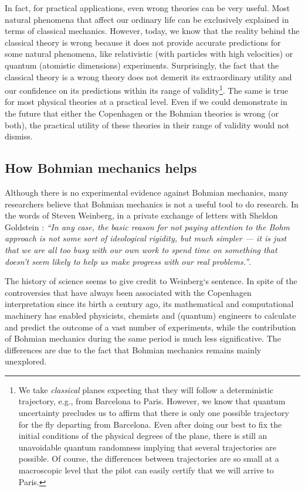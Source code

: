 \documentclass[nofootinbib, secnumarabic, amsmath, nobibnotes,10pt,aps,pra]{revtex4-1}
\begin{document}
In fact, for practical applications, even wrong theories can be very useful. Most natural phenomena that affect our ordinary life can be exclusively explained in terms of classical mechanics. However, today, we know that the reality behind the classical theory is wrong because it does not provide accurate predictions for some natural phenomena, like relativistic (with particles with high velocities) or quantum (atomistic dimensions) experiments.  Surprisingly, the fact that the classical theory is a wrong theory does not demerit its extraordinary utility and our confidence on its predictions within its range of validity\footnote{We take \emph{classical} planes expecting that they will follow a deterministic trajectory, e.g., from Barcelona to Paris. However, we know that quantum uncertainty precludes us to affirm that there is only one possible trajectory for the fly departing from Barcelona. Even after doing our best to fix the initial conditions of the physical degrees of the plane, there is still an unavoidable quantum randomness implying that several trajectories are possible. Of course, the differences between trajectories are so small at a macroscopic level that the pilot can easily certify that we will arrive to Paris.}. The same is true for most physical theories at a practical level. Even if we could demonstrate in the future that either the Copenhagen or the Bohmian theories is wrong (or both), the practical utility of these theories in their range of validity would not dismiss.  


\subsection{How Bohmian mechanics helps}\label{sec_why}

Although there is no experimental evidence against Bohmian mechanics, many researchers believe that Bohmian mechanics is not a useful tool to do research. In the words of Steven Weinberg, in a private exchange of letters with Sheldon Goldstein \cite{om.Weinberg}: \textit{``In any case, the basic reason for not paying attention to the Bohm approach is not some sort of ideological rigidity, but much simpler --- it is just that we are all too busy with our own work to spend time on something that doesn't seem likely to help us make progress with our real problems.''}.

The history of science seems to give credit to Weinberg`s sentence. In spite of the controversies that have always been associated with the Copenhagen interpretation since its birth a century ago, its mathematical and computational machinery has enabled physicists, chemists and (quantum) engineers to calculate and predict the outcome of a vast number of experiments, while the contribution of Bohmian mechanics during the same period is much less significative. The differences are due to the fact that Bohmian mechanics remains mainly unexplored.
\end{document}
